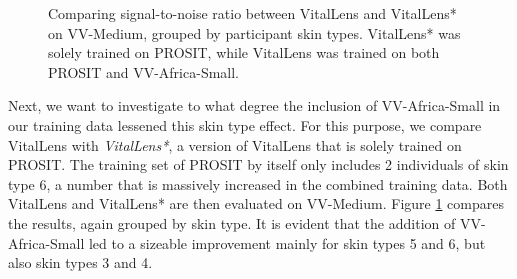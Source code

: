 \documentclass{article}
\begin{document}
\begin{figure}[h!]
  \centering
  \caption{Comparing signal-to-noise ratio between VitalLens and VitalLens* on VV-Medium, grouped by participant skin types. VitalLens* was solely trained on PROSIT, while VitalLens was trained on both PROSIT and VV-Africa-Small.}
  \label{fig:impact-skin-type-comparison}
\end{figure}

Next, we want to investigate to what degree the inclusion of VV-Africa-Small in our training data lessened this skin type effect.
For this purpose, we compare VitalLens with \textit{VitalLens*}, a version of VitalLens that is solely trained on PROSIT.
The training set of PROSIT by itself only includes 2 individuals of skin type 6, a number that is massively increased in the combined training data.
Both VitalLens and VitalLens* are then evaluated on VV-Medium.
Figure \ref{fig:impact-skin-type-comparison} compares the results, again grouped by skin type.
It is evident that the addition of VV-Africa-Small led to a sizeable improvement mainly for skin types 5 and 6, but also skin types 3 and 4.
\end{document}
